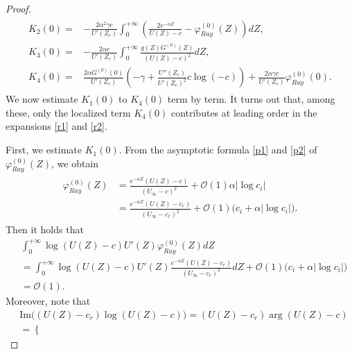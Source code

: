 \documentclass[reqno,11pt]{amsart}
\numberwithin{equation}{section}
\numberwithin{equation}{section}
\theoremstyle{plain}
\begin{document}
\begin{proof}
\begin{align}
\begin{aligned}
					K_2(0)= &-\frac{2\alpha^2\gamma c}{U'(Z_c)}\int_{0}^{+\infty}\left(\frac{2e^{-\alpha Z}}{U(Z)-c}-\varphi_{Ray}^{(0)}(Z)\right)dZ,\\
					K_3(0)=&-\frac{2\alpha c}{U'(Z_c)}\int_{0}^{+\infty}\frac{g(Z)G^{(0)}(Z)}{(U(Z)-c)^2}dZ,\\
					K_4(0) =& \frac{2\alpha G^{(0)}(0)}{U'(Z_c)}\left(-\gamma+\frac{U''(Z_c)}{U'(Z_c)^2}c\log(-c)\right)
					+\frac{2\alpha\gamma c}{U'(Z_c)}\varphi_{Ray}^{(0)}(0).\nonumber
			\end{aligned}\end{align}
		We now estimate $K_1(0)$ to $K_4(0)$ term by term. It turns out that, among these, only the localized term $K_4(0)$ contributes at leading order in the expansions \eqref{r1} and \eqref{r2}.
		
	 First, we estimate $K_1(0)$.  From the asymptotic formula \eqref{p1} and \eqref{p2} of $\varphi^{(0)}_{Ray}(Z)$, we obtain 
			\begin{align}\begin{aligned}
					\varphi_{Ray}^{(0)}(Z)&=\frac{e^{-\alpha Z}(U(Z)-c)}{(U_\infty-c)^2}+\mathcal{O}(1)\alpha|\log c_i|\\
					&=\frac{e^{-\alpha Z}(U(Z)-c_r)}{(U_\infty-c_r)^2}+\mathcal{O}(1)\big(c_i+\alpha|\log c_i|\big).\nonumber
			\end{aligned}\end{align}
		Then it holds that
			\begin{align*}
				&\int_{0}^{+\infty}\log(U(Z)-c) U'(Z)\varphi_{Ray}^{(0)}(Z)dZ\\
				&= \int_{0}^{+\infty}\log(U(Z)-c) U'(Z)\frac{e^{-\alpha Z}(U(Z)-c_r)}{(U_\infty-c_r)^2}dZ+\mathcal{O}(1)\big(c_i+\alpha |\log c_i|\big)\\
				&=\mathcal{O}(1).
			\end{align*}
			Moreover, note that
			\begin{align*}
				&\text{Im}\Big((U(Z)-c_r)\log(U(Z)-c)\Big)= (U(Z)-c_r)\arg(U(Z)-c)\\
				&=\begin{cases}

\end{cases}
\end{align*}
\end{proof}
\end{document}
